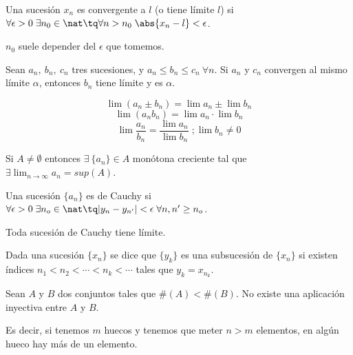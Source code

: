 \documentclass[nochap]{apuntes}
\begin{document}
\begin{defn}
Una sucesión $x_n$ es convergente a $l$ (o tiene límite $l$) si $\forall \epsilon > 0 \;\exists n_0 \in \nat \tq \forall n > n_0 \;\abs{x_n -l} < \epsilon$.

$n_0$ suele depender del $\epsilon$ que tomemos.
\end{defn}

\begin{theorem}
Sean $a_n,\: b_n, \: c_n$ tres sucesiones, y $a_n\leq b_n \leq c_n \:\forall n$. Si $a_n$ y $c_n$ convergen al mismo límite $\alpha$, entonces $b_n$ tiene límite y es $\alpha$.
\end{theorem}

\begin{prop}
\[ \lim (a_n \pm b_n) = \lim a_n \pm \lim b_n \]
\[ \lim (a_n b_n) = \lim a_n \cdot \lim b_n \]
\[ \lim \frac{a_n}{b_n} = \frac{\lim a_n}{\lim b_n} \; ;\lim b_n \neq 0\]
\end{prop}

\begin{lemma}
Si $A\neq \emptyset$ entonces $\exists\: \{a_n\} \in A$ monótona creciente tal que $\exists \lim_{n\to\infty} a_n= sup(A)$.\end{lemma}

\begin{defn}
Una sucesión $\{a_n\}$ es de Cauchy si $\forall \epsilon > 0 \; \exists n_o \in \nat \tq |y_n-y_{n'}| < \epsilon \; \forall n,n' \geq n_o$.\end{defn}

\begin{prop}Toda sucesión de Cauchy tiene límite.\end{prop}

\begin{defn}[Subsucesión] Dada una sucesión $\{x_n\}$ se dice que $\{y_k\}$ es una subsucesión de $\{x_n\}$ si existen índices $n_1 < n_2 < \cdots < n_k < \cdots$ tales que $y_k=x_{n_k}$.\end{defn}

\begin{theorem}
Sean $A$ y $B$ dos conjuntos tales que $\#(A) < \#(B)$. No existe una aplicación inyectiva entre $A$ y $B$.

Es decir, si tenemos $m$ huecos y tenemos que meter $n>m$ elementos, en algún hueco hay más de un elemento.
\end{theorem}
\end{document}
